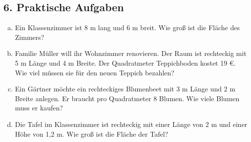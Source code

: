 \vspace{0.5em}

\subsection*{6. Praktische Aufgaben}

\begin{enumerate}[a)]
    \item Ein Klassenzimmer ist 8 m lang und 6 m breit. Wie groß ist die Fläche des Zimmers?
    
    \item Familie Müller will ihr Wohnzimmer renovieren. Der Raum ist rechteckig mit 5 m Länge und 4 m Breite. Der Quadratmeter Teppichboden kostet 19 €. Wie viel müssen sie für den neuen Teppich bezahlen?
    
    \item Ein Gärtner möchte ein rechteckiges Blumenbeet mit 3 m Länge und 2 m Breite anlegen. Er braucht pro Quadratmeter 8 Blumen. Wie viele Blumen muss er kaufen?
    
    \item Die Tafel im Klassenzimmer ist rechteckig mit einer Länge von 2 m und einer Höhe von 1,2 m. Wie groß ist die Fläche der Tafel?
\end{enumerate}



        
    
        
